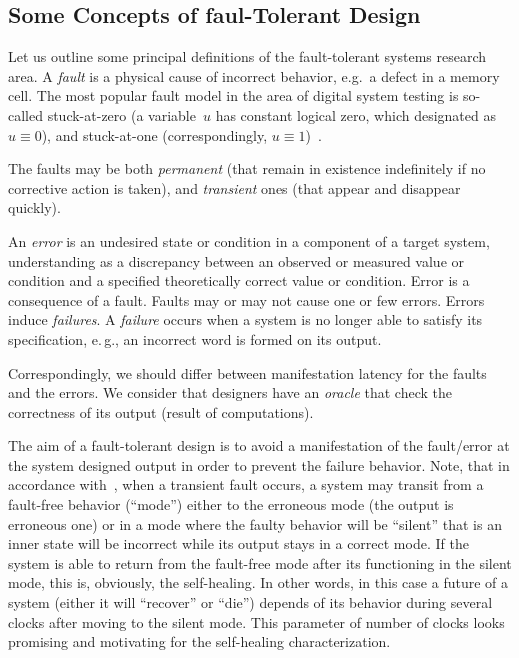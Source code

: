 \begin{multicols}{2}
\section{Some Concepts of faul-Tolerant Design}

Let us outline some principal definitions of the
fault-tolerant systems research area.
A {\it fault} is a physical cause of incorrect behavior,
e.g.\ a defect in a memory cell.
The most popular fault model in the area of digital
system testing is so-called stuck-at-zero (a variable~$u$ 
has constant logical zero, which designated as
$u\equiv 0$), and stuck-at-one (correspondingly,
$u\equiv 1$)~\cite{2fr}.

The faults may be both \textit{permanent} (that remain in
existence indefinitely if no corrective action is
taken), and \textit{transient} ones (that appear and disappear
quickly).

An \textit{error} is an undesired state or condition in
a component of a target system, understanding as a
discrepancy between an observed or measured value
or condition and a specified theoretically correct
value or condition.
Error is a consequence of a fault.
Faults may or may not cause one or few errors.
Errors induce \textit{failures}.
A \textit{failure} occurs when a system is no longer able to
satisfy its specification, e.\,g., an incorrect word
is formed on its output.

Correspondingly, we should differ between
manifestation latency for the faults and the
errors.
We consider that designers have an \textit{oracle} that check
the correctness of its output (result of
computations).

The aim of a fault-tolerant design is to avoid a
manifestation of the fault/error at the system
designed output in order to prevent the failure
behavior.
Note, that in accordance with~\cite{6fr}, when a transient
fault occurs, a system may transit from a fault-free
behavior (``mode'') either to the erroneous mode
(the output is erroneous one) or in a mode where
the faulty behavior will be ``silent'' that is an
inner state will be incorrect while its output stays
in a correct mode.
If the system is able to return from the fault-free
mode after its functioning in the silent mode, this
is, obviously, the self-healing.
In other words, in this case a future of a system
(either it will ``recover'' or ``die'') depends of its
behavior during several clocks after moving to the
silent mode.
This parameter of number of clocks looks promising
and motivating for the self-healing characterization.


\end{multicols}

